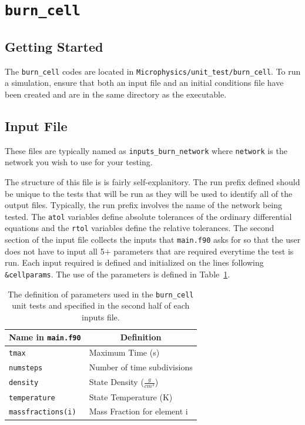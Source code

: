 \section{{\tt burn\_cell}}

\subsection{Getting Started}

The {\tt burn\_cell} codes are located in {\tt Microphysics/unit\_test/burn\_cell}. To run a simulation, ensure that both an input file and an initial conditions file have been created and are in the same directory as the executable. 

\subsection{Input File}

These files are typically named as {\tt inputs\_burn\_network} where {\tt network} is the network you wish to use for your testing.

The structure of this file is is fairly self-explanitory.
The run prefix defined should be unique to the tests that will be run as they will be used to identify all of the output files. Typically, the run prefix involves the name of the network being tested.
The {\tt atol} variables define absolute tolerances of the ordinary differential equations and the {\tt rtol} variables define the relative tolerances.
The second section of the input file collects the inputs that {\tt main.f90} asks for so that the user does not have to input all 5$+$ parameters that are required everytime the test is run.
Each input required is defined and initialized on the lines following {\tt \&cellparams}.
The use of the parameters is defined in Table~\ref{tab:init-structure}.

\begin{table}
	\centering
	\begin{tabular}{|l|l|}
		\hline
			\multicolumn{1}{|c|}{\textbf{Name in {\tt main.f90}}} &
			\multicolumn{1}{|c|}{\textbf{Definition}} \\
		\hline
		\rowcolor{tableShade}
		{\tt tmax} & Maximum Time (s) \\
		{\tt numsteps} & Number of time subdivisions \\
		\rowcolor{tableShade}
		{\tt density} & State Density ($\frac{g}{cm^3}$) \\
		{\tt temperature} & State Temperature (K) \\
		\rowcolor{tableShade}
		{\tt massfractions(i)} & Mass Fraction for element i \\
		\hline
	\end{tabular}
	\caption{The definition of parameters used in the {\tt burn\_cell} unit tests and specified in the second half of each inputs file.}
	\label{tab:init-structure}
\end{table}

